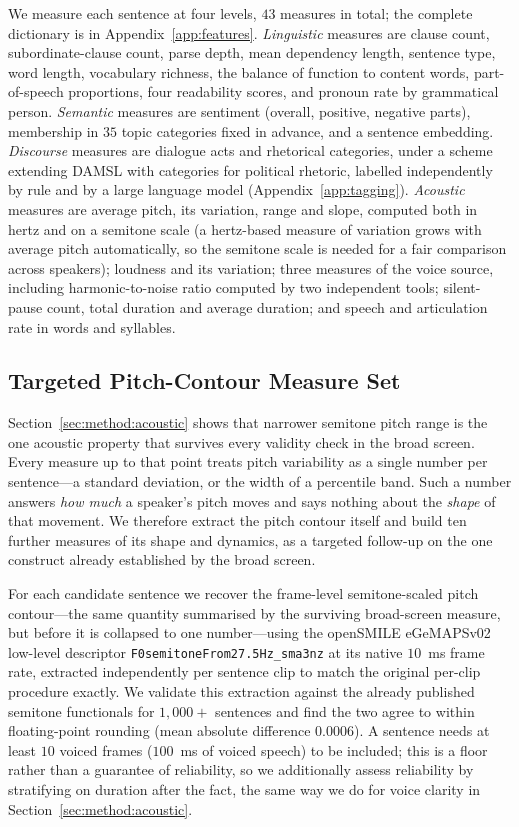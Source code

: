 \documentclass[journal]{IEEEtran}
\begin{document}
We measure each sentence at four levels, $43$ measures in total; the
complete dictionary is in Appendix~\ref{app:features}. \emph{Linguistic}
measures are clause count, subordinate-clause count, parse depth, mean
dependency length, sentence type, word length, vocabulary richness, the
balance of function to content words, part-of-speech proportions, four
readability scores, and pronoun rate by grammatical person. \emph{Semantic}
measures are sentiment (overall, positive, negative parts), membership in
$35$ topic categories fixed in advance, and a sentence embedding.
\emph{Discourse} measures are dialogue acts and rhetorical categories, under
a scheme extending DAMSL \cite{core1997damsl} with categories for political
rhetoric, labelled independently by rule and by a large language model
(Appendix~\ref{app:tagging}). \emph{Acoustic} measures are average pitch, its
variation, range and slope, computed both in hertz and on a semitone scale
(a hertz-based measure of variation grows with average pitch automatically,
so the semitone scale is needed for a fair comparison across speakers);
loudness and its variation; three measures of the voice source, including
harmonic-to-noise ratio computed by two independent tools; silent-pause
count, total duration and average duration; and speech and articulation rate
in words and syllables.

\subsection{Targeted Pitch-Contour Measure Set}
\label{sec:method:pitch:extract}

Section~\ref{sec:method:acoustic} shows that narrower semitone pitch range is
the one acoustic property that survives every validity check in the broad
screen. Every measure up to that point treats pitch variability as a single
number per sentence---a standard deviation, or the width of a percentile
band. Such a number answers \emph{how much} a speaker's pitch moves and says
nothing about the \emph{shape} of that movement. We therefore extract the
pitch contour itself and build ten further measures of its shape and
dynamics, as a targeted follow-up on the one construct already established
by the broad screen.

For each candidate sentence we recover the frame-level semitone-scaled pitch
contour---the same quantity summarised by the surviving broad-screen
measure, but before it is collapsed to one number---using the openSMILE
eGeMAPSv02 low-level descriptor \texttt{F0semitoneFrom27.5Hz\_sma3nz} at its
native $10$~ms frame rate, extracted independently per sentence clip to match
the original per-clip procedure exactly. We validate this extraction against
the already published semitone functionals for $1{,}000+$ sentences and find
the two agree to within floating-point rounding (mean absolute difference
$0.0006$). A sentence needs at least $10$ voiced frames ($100$~ms of voiced
speech) to be included; this is a floor rather than a guarantee of
reliability, so we additionally assess reliability by stratifying on
duration after the fact, the same way we do for voice clarity in
Section~\ref{sec:method:acoustic}.
\end{document}
